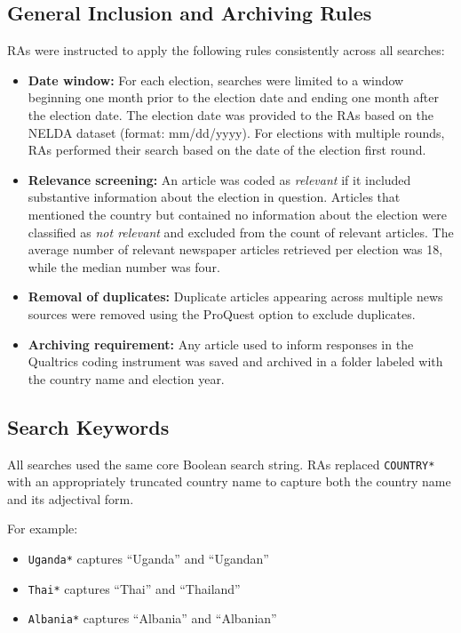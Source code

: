 \documentclass[USletter,12pt, titlepage]{article} %
\begin{document}
\subsection{General Inclusion and Archiving Rules}

RAs were instructed to apply the following rules consistently across all searches:

\begin{itemize}
    \item \textbf{Date window:} For each election, searches were limited to a window beginning one month prior to the election date and ending one month after the election date. The election date was provided to the RAs based on the NELDA dataset (format: mm/dd/yyyy). For elections with multiple rounds, RAs performed their search based on the date of the election first round. 
    \item \textbf{Relevance screening:} An article was coded as \emph{relevant} if it included substantive information about the election in question. Articles that mentioned the country but contained no information about the election were classified as \emph{not relevant} and excluded from the count of relevant articles. The average number of relevant newspaper articles retrieved per election was 18, while the median number was four.
    \item \textbf{Removal of duplicates:} Duplicate articles appearing across multiple news sources were removed using the ProQuest option to exclude duplicates. 
    \item \textbf{Archiving requirement:} Any article used to inform responses in the Qualtrics coding instrument was saved and archived in a folder labeled with the country name and election year.
    
\end{itemize}

\subsection{Search Keywords}

All searches used the same core Boolean search string. RAs replaced \texttt{COUNTRY*} with an appropriately truncated country name to capture both the country name and its adjectival form.

For example:
\begin{itemize}
    \item \texttt{Uganda*} captures ``Uganda'' and ``Ugandan''
    \item \texttt{Thai*} captures ``Thai'' and ``Thailand''
    \item \texttt{Albania*} captures ``Albania'' and ``Albanian''
\end{itemize}
\end{document}
